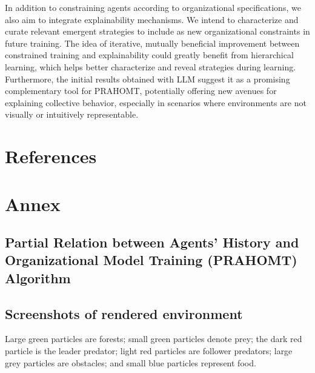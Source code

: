 \documentclass[runningheads]{llncs}
\theoremstyle{freethm}
\theoremstyle{proofoutline}
\begin{document}
In addition to constraining agents according to organizational specifications, we also aim to integrate explainability mechanisms. We intend to characterize and curate relevant emergent strategies to include as new organizational constraints in future training. The idea of iterative, mutually beneficial improvement between constrained training and explainability could greatly benefit from hierarchical learning, which helps better characterize and reveal strategies during learning. Furthermore, the initial results obtained with LLM suggest it as a promising complementary tool for PRAHOMT, potentially offering new avenues for explaining collective behavior, especially in scenarios where environments are not visually or intuitively representable.


\section*{References}





\newpage

\section*{Annex}

\subsection*{Partial Relation between Agents' History and Organizational Model Training (PRAHOMT) Algorithm}


\subsection*{Screenshots of rendered environment}\label{sec:screenshots}

Large green particles are forests; small green particles denote prey; the dark red particle is the leader predator; light red particles are follower predators; large grey particles are obstacles; and small blue particles represent food.
\end{document}
